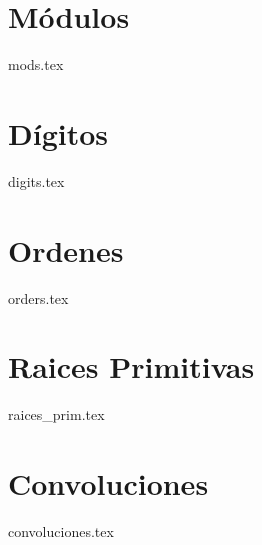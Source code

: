 \chapter{M\'odulos}
{mods.tex}

\chapter{D\'igitos}
{digits.tex}

\chapter{Ordenes}
{orders.tex}

\chapter{Raices Primitivas}
{raices_prim.tex}

\chapter{Convoluciones}
{convoluciones.tex}